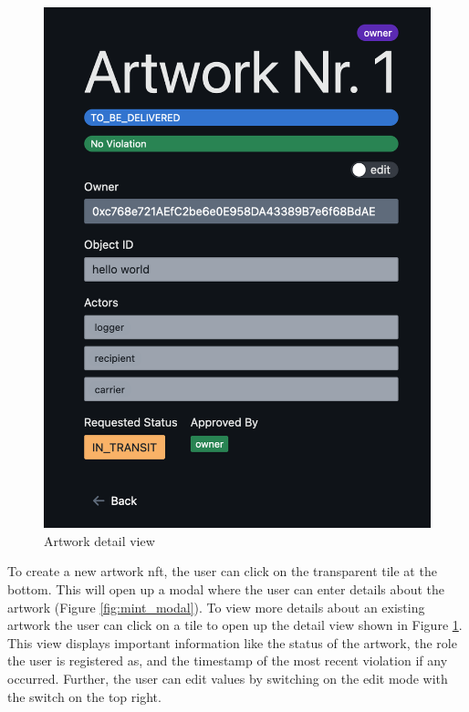 \begin{figure}
\begin{minipage}{0.45\textwidth}
        \includegraphics[height=0.4\textheight]{resources/frontend_screenshots/artwork_details.png}
        \caption{Artwork detail view}
        \label{fig:artwork_detail}
    \end{minipage}
\end{figure}

To create a new artwork \gls{nft}, the user can click on the transparent tile at the bottom. This will open up a modal where the user can enter details about the artwork (Figure \ref{fig:mint_modal}). To view more details about an existing artwork the user can click on a tile to open up the detail view shown in Figure \ref{fig:artwork_detail}. This view displays important information like the status of the artwork, the role the user is registered as, and the timestamp of the most recent violation if any occurred. Further, the user can edit values by switching on the edit mode with the switch on the top right.  

